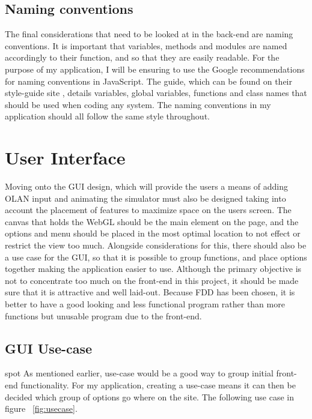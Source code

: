 \clearpage

\subsection{Naming conventions}
The final considerations that need to be looked at in the back-end are naming conventions. It is important that variables, methods and modules are named accordingly to their function, and so that they are easily readable. For the purpose of my application, I will be ensuring to use the Google recommendations for naming conventions in JavaScript. The guide, which can be found on their style-guide site \cite{google_javascript}, details variables, global variables, functions and class names that should be used when coding any system. The naming conventions in my application should all follow the same style throughout.

\section{User Interface}
Moving onto the GUI design, which will provide the users a means of adding OLAN input and animating the simulator must also be designed taking into account the placement of features to maximize space on the users screen. The canvas that holds the WebGL should be the main element on the page, and the options and menu should be placed in the most optimal location to not effect or restrict the view too much. Alongside considerations for this, there should also be a use case for the GUI, so that it is possible to group functions, and place options together making the application easier to use. Although the primary objective is not to concentrate too much on the front-end in this project, it should be made sure that it is attractive and well laid-out. Because FDD has been chosen, it is better to have a good looking and less functional program rather than more functions but unusable program due to the front-end.

\subsection{GUI Use-case}spot
As mentioned earlier, use-case would be a good way to group initial front-end functionality. For my application, creating a use-case means it can then be decided which group of options go where on the site. The following use case in figure ~\ref{fig:usecase}.

